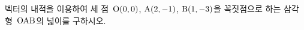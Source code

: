 벡터의 내적을 이용하여 세 점~$\mathrm{O}(0{,}\mkern3mu\mathopen{}0)$, $\mathrm{A}(2{,}\mkern3mu\mathopen{}-1)$, $\mathrm{B}(1{,}\mkern3mu\mathopen{}-3)$을 꼭짓점으로 하는 삼각형~$\mathrm{OAB}$의 넓이를 구하시오.
